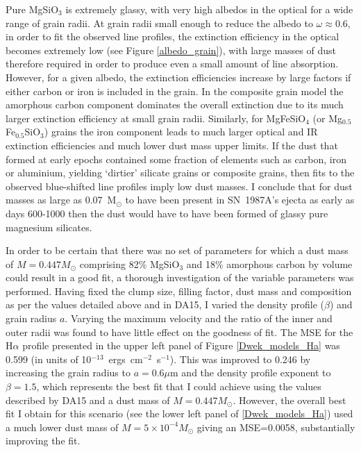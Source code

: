Pure MgSiO$_3$ is extremely glassy, with very high albedos in the optical 
for a wide range of grain radii.  At grain radii small enough to reduce 
the albedo to $\omega \approx 0.6$, in order to fit the observed line 
profiles, the extinction efficiency in the optical becomes extremely low 
(see Figure \ref{albedo_grain}), with large masses of dust therefore 
required in order to produce even a small amount of line absorption. 
However, for a given albedo, the extinction efficiencies increase by large 
factors if either carbon or iron is included in the grain. In the 
composite grain model the amorphous carbon component dominates the overall 
extinction due to its much larger extinction efficiency at small grain 
radii. Similarly, for MgFeSiO$_4$ (or Mg$_{0.5}$Fe$_{0.5}$SiO$_3$) grains
the iron component leads to much larger optical and IR extinction
efficiencies and much lower dust mass upper limits.
If the dust that formed at early epochs contained some fraction of 
elements such as carbon, iron or aluminium, yielding `dirtier' silicate 
grains or composite grains, then fits to the observed blue-shifted line 
profiles imply low dust masses. I conclude that for dust masses as large
as 0.07~M$_\odot$ to have been present in SN~1987A's ejecta as early as 
days 600-1000 then the dust would have to have been formed of glassy pure 
magnesium silicates.

In order to be certain that there was no set of parameters for which a dust mass of $M=0.447M_{\odot}$ comprising 82\% MgSiO$_3$ and 18\% amorphous carbon by volume could result in a good fit, a thorough investigation of the variable parameters was performed.  Having fixed the clump size, filling factor, dust mass and composition as per the values detailed above and in DA15, I varied the density profile ($\beta$) and grain radius $a$.  Varying the maximum velocity and the ratio of the inner and outer radii was found to have little effect on the goodness of fit.  The MSE for the H$\alpha$ profile presented in the upper left panel of Figure \ref{Dwek_models_Ha} was 0.599 (in units of 10$^{-13}$~ergs~cm$^{-2}$~s$^{-1}$).  This was improved to 0.246 by increasing the grain radius to $a=0.6\mu$m and the density profile exponent to $\beta=1.5$, which represents the best fit that I could achieve using the values described by DA15 and a dust mass of $M=0.447M_{\odot}$.  However, the overall best fit I obtain for this scenario (see the lower left panel of \ref{Dwek_models_Ha}) used a much lower dust mass of $M=5 \times 10^{-4}M_{\odot}$ giving an MSE=0.0058, substantially improving the fit.

